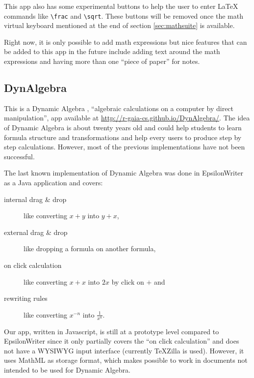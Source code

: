 This app also has some experimental buttons to help the user to enter LaTeX
commands like
{\tt \textbackslash frac} and {\tt \textbackslash sqrt}. These buttons will be
removed once the math virtual keyboard mentioned at the end of section
\ref{sec:mathsuite} is available.

Right now, it is only possible to add math expressions but nice features that can be
added to this app in the future include adding text around the math expressions and
having more than one ``piece of paper'' for notes.

\subsection{DynAlgebra}

This is a Dynamic Algebra \cite{Nicaud1}, ``algebraic calculations
on a computer by direct manipulation'', app available at
\href{http://r-gaia-cs.github.io/DynAlgebra/}{http://r-gaia-cs.github.io/DynAlgebra/}.
The idea of Dynamic Algebra is about twenty years old and could help
students to learn formula structure and transformations and help every users to
produce step by step calculations. However, most of the previous implementations
have not been successful.

The last known implementation of Dynamic Algebra was done in EpsilonWriter
\cite{Nicaud2} as a Java application and covers:
\begin{description}
  \item[internal drag \& drop] like converting $x + y$ into $y + x$,
  \item[external drag \& drop] like dropping a formula on another formula,
  \item[on click calculation] like converting $x + x$ into $2 x$ by click on $+$ and
  \item[rewriting rules] like converting $x^{-n}$ into $\frac{1}{x^n}$.
\end{description}

Our app, written in Javascript, is still at a prototype level compared
to EpsilonWriter since it only partially
covers the ``on click calculation'' and does not have a WYSIWYG input interface
(currently TeXZilla is used). However, it uses MathML as storage format,
which makes possible to work in documents not intended to be used for
Dynamic Algebra.
